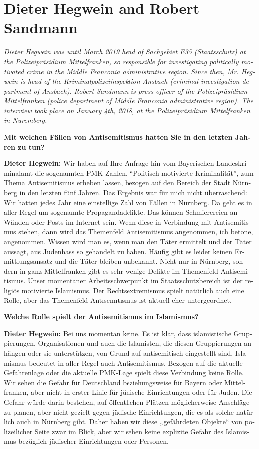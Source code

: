 \section{Dieter Hegwein and Robert Sandmann}
\begin{otherlanguage}{ngerman}
\textit{Dieter Hegwein was until March 2019 head of Sachgebiet E35 (Staatsschutz) at the Polizeipräsidium Mittelfranken, so responsible for investigating politically motivated crime in the Middle Franconia administrative region. Since then, Mr. Hegwein is head of the Kriminalpolizeiinspektion Ansbach (criminal investigation department of Ansbach). Robert Sandmann is press officer of the Polizeipräsidium Mittelfranken (police department of Middle Franconia administrative region). 
The interview took place on January 4th, 2018, at the Polizeipräsidium Mittelfranken in Nuremberg.}\par 
\vspace*{2em}
\textbf{Mit welchen Fällen von Antisemitismus hatten Sie in den letzten Jahren zu tun?}

\textbf{Dieter Hegwein:} Wir haben auf Ihre Anfrage hin vom Bayerischen Landeskriminalamt die sogenannten PMK-Zahlen, ``Politisch motivierte Kriminalität'', zum Thema Antisemitismus erheben lassen, bezogen auf den Bereich der Stadt Nürnberg in den letzten fünf Jahren. Das Ergebnis war für mich nicht überraschend: Wir hatten jedes Jahr eine einstellige Zahl von Fällen in Nürnberg. Da geht es in aller Regel um sogenannte Propagandadelikte. Das können Schmierereien an Wänden oder Posts im Internet sein. Wenn diese in Verbindung mit Antisemitismus stehen, dann wird das Themenfeld Antisemitismus angenommen, ich betone, angenommen. Wissen wird man es, wenn man den Täter ermittelt und der Täter aussagt, aus Judenhass so gehandelt zu haben. Häufig gibt es leider keinen Ermittlungsansatz und die Täter bleiben unbekannt. Nicht nur in Nürnberg, sondern in ganz Mittelfranken gibt es sehr wenige Delikte im Themenfeld Antisemitismus. Unser momentaner Arbeitsschwerpunkt im Staatsschutzbereich ist der religiös motivierte Islamismus. Der Rechtsextremismus spielt natürlich auch eine Rolle, aber das Themenfeld Antisemitismus ist aktuell eher untergeordnet. 

\textbf{Welche Rolle spielt der Antisemitismus im Islamismus?}

\textbf{Dieter Hegwein:} Bei uns momentan keine. Es ist klar, dass islamistische Gruppierungen, Organisationen und auch die Islamisten, die diesen Gruppierungen anhängen oder sie unterstützen, von Grund auf antisemitisch eingestellt sind. Islamismus bedeutet in aller Regel auch Antisemitismus. Bezogen auf die aktuelle Gefahrenlage oder die aktuelle PMK-Lage spielt diese Verbindung keine Rolle. Wir sehen die Gefahr für Deutschland beziehungsweise für Bayern oder Mittelfranken, aber nicht in erster Linie für jüdische Einrichtungen oder für Juden. Die Gefahr würde darin bestehen, auf öffentlichen Plätzen möglicherweise Anschläge zu planen, aber nicht gezielt gegen jüdische Einrichtungen, die es als solche natürlich auch in Nürnberg gibt. Daher haben wir diese „gefährdeten Objekte“ von polizeilicher Seite zwar im Blick, aber wir sehen keine explizite Gefahr des Islamismus bezüglich jüdischer Einrichtungen oder Personen.


\end{otherlanguage}

